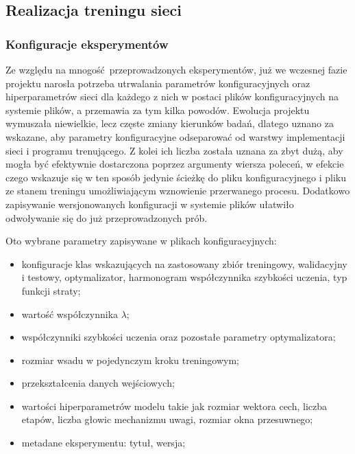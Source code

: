 \subsection{Realizacja treningu sieci}

\subsubsection{Konfiguracje eksperymentów}
Ze względu na mnogość przeprowadzonych eksperymentów, już we wczesnej fazie projektu narosła potrzeba utrwalania parametrów konfiguracyjnych oraz hiperparametrów sieci dla każdego z nich w postaci plików konfiguracyjnych na systemie plików, a przemawia za tym kilka powodów. Ewolucja projektu wymuszała niewielkie, lecz częste zmiany kierunków badań, dlatego uznano za wskazane, aby parametry konfiguracyjne odseparować od warstwy implementacji sieci i programu trenującego. Z kolei ich liczba została uznana za zbyt dużą, aby mogła być efektywnie dostarczona poprzez argumenty wiersza poleceń, w efekcie czego wskazuje się w ten sposób jedynie ścieżkę do pliku konfiguracyjnego i pliku ze stanem treningu umożliwiającym wznowienie przerwanego procesu. Dodatkowo zapisywanie wersjonowanych konfiguracji w systemie plików ułatwiło odwoływanie się do już przeprowadzonych prób.

Oto wybrane parametry zapisywane w plikach konfiguracyjnych:
\begin{itemize}
	\item konfiguracje klas wskazujących na zastosowany zbiór treningowy, walidacyjny i testowy, optymalizator, harmonogram współczynnika szybkości uczenia, typ funkcji straty;
	\item wartość współczynnika \( \lambda \);
	\item współczynniki szybkości uczenia oraz pozostałe parametry optymalizatora;
	\item rozmiar wsadu w pojedynczym kroku treningowym;
	\item przekształcenia danych wejściowych;
	\item wartości hiperparametrów modelu takie jak rozmiar wektora cech, liczba etapów, liczba głowic mechanizmu uwagi, rozmiar okna przesuwnego;
	\item metadane eksperymentu: tytuł, wersja;
\end{itemize}

